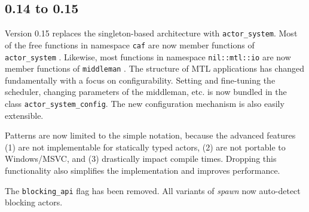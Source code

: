 \clearpage
\subsection{0.14 to 0.15}

Version 0.15 replaces the singleton-based architecture with
\lstinline^actor_system^. Most of the free functions in namespace
\lstinline^caf^ are now member functions of \lstinline^actor_system^
. Likewise, most functions in namespace \lstinline^nil::mtl::io^
are now member functions of \lstinline^middleman^ . The
structure of MTL applications has changed fundamentally with a focus on
configurability. Setting and fine-tuning the scheduler, changing parameters of
the middleman, etc. is now bundled in the class
\lstinline^actor_system_config^. The new configuration mechanism is also easily
extensible.

Patterns are now limited to the simple notation, because the advanced features
(1) are not implementable for statically typed actors, (2) are not portable to
Windows/MSVC, and (3) drastically impact compile times. Dropping this
functionality also simplifies the implementation and improves performance.

The \lstinline^blocking_api^ flag has been removed. All variants of
\emph{spawn} now auto-detect blocking actors.
